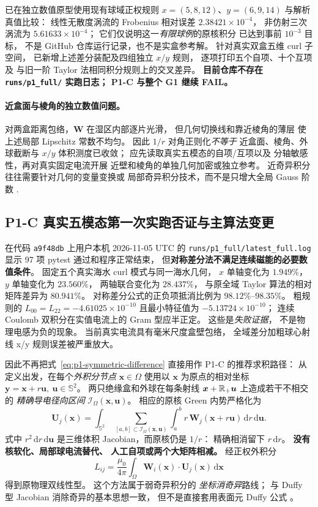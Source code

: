 已在独立数值原型使用现有球域正权规则
$x=(5,8,12)$、$y=(6,9,14)$
与解析真值比较：
线性无散度涡流的 Frobenius 相对误差
$2.38421\times10^{-4}$，
非仿射三次涡流为
$5.61633\times10^{-4}$；
它们仅说明这一\emph{有限球例}的原核积分
已达到事前 $10^{-3}$ 目标，
不是 GitHub 仓库运行记录，也不是实盒参考解。
针对真实双盒五维 curl 子空间，
已新增上述差分装配及四组独立 $x/y$ 规则，
逐项打印五个自项、十个互项及
与旧一阶 Taylor 法相同积分规则上的交叉差异。
\textbf{目前仓库不存在 \texttt{runs/p1\_full/} 实跑日志；
P1-C 与整个 G1 继续 FAIL。}

\paragraph{近盒面与棱角的独立数值问题。}
对两盒距离包络，$\bm W$ 在湿区内部逐片光滑，
但几何切换线和靠近棱角的薄层
使上述局部 Lipschitz 常数不均匀。
因此 $1/r$ 对角正则化\emph{不等于}
近盒面、棱角、外球截断与 $x/y$ 体积测度已收敛；
应先读取真实五模态的自项/互项以及
分轴敏感性，再对真实固定电流开展
近壁和棱角的单独几何加密或独立参考。
近奇异积分往往需要针对几何的变量变换或
局部奇异积分技术，而不是只增大全局 Gauss 阶数
\cite{duffy1982,montanelli2022curved,hu2026near}.


\subsection{P1-C 真实五模态第一次实跑否证与主算法变更}
\label{sec:p1-direct-radial-ray}
在代码 \texttt{a9f48db} 上用户本机 2026-11-05 UTC 的
\texttt{runs/p1\_full/latest\_full.log}
显示 97 项 pytest 通过和程序正常结束，
但\textbf{对称差分法不满足连续磁能的必要数值条件}。
固定五个真实海水 curl 模式与同一海水几何，
$x$ 单轴变化为 $1.949\%$，
$y$ 单轴变化为 $23.560\%$，
两轴联合变化为 $28.437\%$，
与原全域 Taylor 算法的相对矩阵差异为 $80.941\%$。
对称差分公式的正负项抵消比例为
$98.12\%$--$98.35\%$。
粗规则的 $L_{00}=L_{22}=-4.61025\times10^{-10}$
且最小特征值为 $-5.13724\times10^{-10}$；
连续 Coulomb 双积分在实值电流上的 Gram 型应半正定。
这些是\emph{失败证据}，
不是物理电感为负的现象。
当前真实电流具有毫米尺度盒壁包络，
全域差分加粗球心射线 x/y 规则误差被严重放大。

因此不再把式~\eqref{eq:p1-symmetric-difference}
直接用作 P1-C 的推荐求积路径：
从定义出发，在每个\emph{外积分节点} $\bm x\in\Omega$
使用以 $\bm x$ 为原点的相对坐标
$\bm y=\bm x+r\bm u,\ \bm u\in\mathbb S^2$。
两只绝缘盒和外球在每条射线
$\bm x+\mathbb R_+\bm u$ 上造成若干不相交的
\emph{精确导电径向区间}
$\mathcal I_\Omega(\bm x,\bm u)$。
相应的原核 Green 内势严格化为
\begin{equation}
\label{eq:p1-direct-ray}
\boxed{
\bm U_j(\bm x)=
\int_{\mathbb S^2}\ \sum_{[a,b]\subset\mathcal I_\Omega(\bm x,\bm u)}
\int_a^b r\,\bm W_j(\bm x+r\bm u)
\,\mathrm dr\,\mathrm d\bm u .
}
\end{equation}
式中 $r^2\,\mathrm dr\,\mathrm d\bm u$
是三维体积 Jacobian，而原核仍是 $1/r$：
精确相消留下 $r\,\mathrm dr$。
\textbf{没有核软化、局部球电流替代、
人工自项或两个大矩阵相减。}
经正权外积分
\[
L_{ij}=\frac{\mu_0}{4\pi}
\int_\Omega \bm W_i(\bm x)\cdot
\bm U_j(\bm x)\,\mathrm d\bm x
\]
得到原物理双线性型。
这个方法属于弱奇异积分的
\emph{坐标消奇异}路线；
与 Duffy 型 Jacobian 消除奇异的基本思想一致，
但不是直接套用表面元 Duffy 公式
\cite{duffy1982,passarotto2022}。

